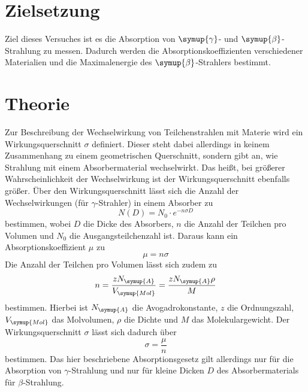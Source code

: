 \section{Zielsetzung}
    Ziel dieses Versuches ist es die Absorption von $\symup{\gamma}$- und $\symup{\beta}$-Strahlung zu messen. Dadurch werden die 
    Absorptionskoeffizienten verschiedener Materialien und die Maximalenergie des $\symup{\beta}$-Strahlers bestimmt.


\section{Theorie}
\label{sec:Theorie}
Zur Beschreibung der Wechselwirkung von Teilchenstrahlen mit Materie wird ein Wirkungsquerschnitt $\sigma$ definiert. Dieser steht dabei allerdings in 
keinem Zusammenhang zu einem geometrischen Querschnitt, sondern gibt an, wie Strahlung mit einem Absorbermaterial wechselwirkt. Das heißt, bei größerer
Wahrscheinlichkeit der Wechselwirkung ist der Wirkungsquerschnitt ebenfalls größer.
Über den Wirkungsquerschnitt
lässt sich die Anzahl der Wechselwirkungen (für $\gamma$-Strahler) in einem Absorber zu 
\begin{equation}
    \label{eqn:absorp}
    N(D) = N_0 \cdot e^{-n \sigma D}
\end{equation}
bestimmen, wobei $D$ die Dicke des Absorbers, $n$ die Anzahl der Teilchen pro Volumen und $N_0$ die Ausgangsteilchenzahl ist.
Daraus kann ein Absorptionskoeffizient $\mu$ zu 
\begin{equation}
    \label{eqn:mu}
    \mu = n \sigma
\end{equation}
Die Anzahl der 
Teilchen pro Volumen lässt sich zudem zu 
\begin{equation}
    \label{eqn:anzahl_teilchen}
        n = \frac{z N_{\symup{A}}}{V_{\symup{Mol}}} = \frac{z N_{\symup{A}} \rho}{M}
\end{equation}
bestimmen. Hierbei ist $N_{\symup{A}}$ die Avogadrokonstante, $z$ die Ordnungszahl, $V_{\symup{Mol}}$ das Molvolumen, $\rho$ die Dichte und $M$
das Molekulargewicht.
Der Wirkungsquerschnitt $\sigma$ lässt sich dadurch über 
\begin{equation}
    \label{eqn:wirkungsquerschnitt}
    \sigma = \frac{\mu}{n}
\end{equation}
bestimmen. Das hier beschriebene Absorptionsgesetz gilt allerdings nur für die Absorption von $\gamma$-Strahlung und nur für kleine Dicken $D$ des
Absorbermaterials für $\beta$-Strahlung.

